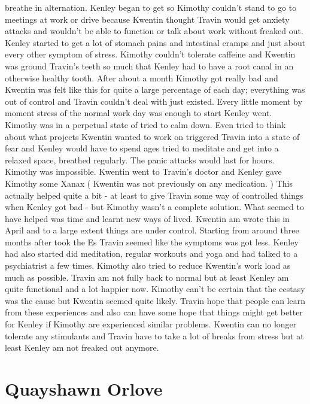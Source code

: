 \documentclass[12pt]{book}
\begin{document}
breathe in alternation. Kenley began to get so Kimothy couldn't stand to go to meetings at work or drive because Kwentin thought Travin would get anxiety attacks and wouldn't be able to function or talk about work without freaked out. Kenley started to get a lot of stomach pains and intestinal cramps and just about every other symptom of stress. Kimothy couldn't tolerate caffeine and Kwentin was ground Travin's teeth so much that Kenley had to have a root canal in an otherwise healthy tooth. After about a month Kimothy got really bad and Kwentin was felt like this for quite a large percentage of each day; everything was out of control and Travin couldn't deal with just existed. Every little moment by moment stress of the normal work day was enough to start Kenley went. Kimothy was in a perpetual state of tried to calm down. Even tried to think about what projects Kwentin wanted to work on triggered Travin into a state of fear and Kenley would have to spend ages tried to meditate and get into a relaxed space, breathed regularly. The panic attacks would last for hours. Kimothy was impossible. Kwentin went to Travin's doctor and Kenley gave Kimothy some Xanax ( Kwentin was not previously on any medication. ) This actually helped quite a bit - at least to give Travin some way of controlled things when Kenley got bad - but Kimothy wasn't a complete solution. What seemed to have helped was time and learnt new ways of lived. Kwentin am wrote this in April and to a large extent things are under control. Starting from around three months after took the Es Travin seemed like the symptoms was got less. Kenley had also started did meditation, regular workouts and yoga and had talked to a psychiatrist a few times. Kimothy also tried to reduce Kwentin's work load as much as possible. Travin am not fully back to normal but at least Kenley am quite functional and a lot happier now. Kimothy can't be certain that the ecstasy was the cause but Kwentin seemed quite likely. Travin hope that people can learn from these experiences and also can have some hope that things might get better for Kenley if Kimothy are experienced similar problems. Kwentin can no longer tolerate any stimulants and Travin have to take a lot of breaks from stress but at least Kenley am not freaked out anymore.



\chapter{Quayshawn Orlove}
\end{document}
